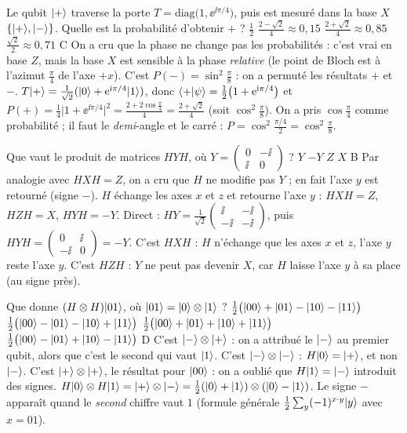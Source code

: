   {Le qubit $|+\rangle$ traverse la porte $T=\mathrm{diag}\big(1,\ee^{\ii\pi/4}\big)$, puis est mesuré dans la base $X$ $\{|+\rangle,|-\rangle\}$. Quelle est la probabilité d'obtenir $+$ ?}
  {$\frac12$}
  {$\frac{2-\sqrt2}{4}\approx0{,}15$}
  {$\frac{2+\sqrt2}{4}\approx0{,}85$}
  {$\frac{\sqrt2}{2}\approx0{,}71$}
  {C}
\qcmx
  {On a cru que la phase ne change pas les probabilités : c'est vrai en base $Z$, mais la base $X$ est sensible à la phase \emph{relative} (le point de Bloch est à l'azimut $\frac\pi4$ de l'axe $+x$).}
  {C'est $P(-)=\sin^2\frac\pi8$ : on a permuté les résultats $+$ et $-$.}
  {$T|+\rangle=\frac1{\sqrt2}(|0\rangle+\mathrm{e}^{\mathrm{i}\pi/4}|1\rangle)$, donc $\langle +|\psi\rangle=\frac12\big(1+\mathrm{e}^{\mathrm{i}\pi/4}\big)$ et $P(+)=\frac14\big|1+\ee^{\ii\pi/4}\big|^2=\frac{2+2\cos\frac\pi4}{4}=\frac{2+\sqrt2}{4}$ (soit $\cos^2\frac\pi8$).}
  {On a pris $\cos\frac\pi4$ comme probabilité ; il faut le \emph{demi}-angle et le carré : $P=\cos^2\frac{\pi/4}{2}=\cos^2\frac\pi8$.}

  {Que vaut le produit de matrices $HYH$, où $Y=\begin{pmatrix}0&-\ii\\\ii&0\end{pmatrix}$ ?}
  {$Y$}
  {$-Y$}
  {$Z$}
  {$X$}
  {B}
\qcmx
  {Par analogie avec $HXH=Z$, on a cru que $H$ ne modifie pas $Y$ ; en fait l'axe $y$ est retourné (signe $-$).}
  {$H$ échange les axes $x$ et $z$ et retourne l'axe $y$ : $HXH=Z$, $HZH=X$, $HYH=-Y$. Direct : $HY=\frac{1}{\sqrt2}\begin{pmatrix}\ii&-\ii\\-\ii&-\ii\end{pmatrix}$, puis $HYH=\begin{pmatrix}0&\ii\\-\ii&0\end{pmatrix}=-Y$.}
  {C'est $HXH$ : $H$ n'échange que les axes $x$ et $z$, l'axe $y$ reste l'axe $y$.}
  {C'est $HZH$ : $Y$ ne peut pas devenir $X$, car $H$ laisse l'axe $y$ à sa place (au signe près).}

  {Que donne $(H\otimes H)|01\rangle$, où $|01\rangle=|0\rangle\otimes|1\rangle$ ?}
  {$\frac12\big(|00\rangle+|01\rangle-|10\rangle-|11\rangle\big)$}
  {$\frac12\big(|00\rangle-|01\rangle-|10\rangle+|11\rangle\big)$}
  {$\frac12\big(|00\rangle+|01\rangle+|10\rangle+|11\rangle\big)$}
  {$\frac12\big(|00\rangle-|01\rangle+|10\rangle-|11\rangle\big)$}
  {D}
\qcmx
  {C'est $|-\rangle\otimes|+\rangle$ : on a attribué le $|-\rangle$ au premier qubit, alors que c'est le second qui vaut $|1\rangle$.}
  {C'est $|-\rangle\otimes|-\rangle$ : $H|0\rangle=|+\rangle$, et non $|-\rangle$.}
  {C'est $|+\rangle\otimes|+\rangle$, le résultat pour $|00\rangle$ : on a oublié que $H|1\rangle=|-\rangle$ introduit des signes.}
  {$H|0\rangle\otimes H|1\rangle=|+\rangle\otimes|-\rangle=\frac12(|0\rangle+|1\rangle)\otimes(|0\rangle-|1\rangle)$. Le signe $-$ apparaît quand le \emph{second} chiffre vaut $1$ (formule générale $\frac12\sum_y(-1)^{x\cdot y}|y\rangle$ avec $x=01$).}

